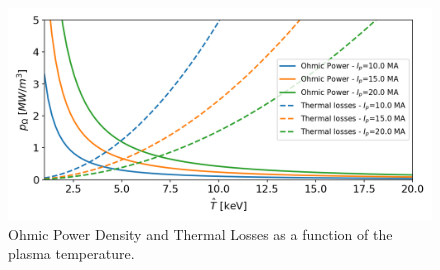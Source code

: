 \begin{figure}[h]
	\centering
	\includegraphics[width=1\linewidth]{figures/chap1/OhmicPower_vs_ThermalLosses}
	\caption{Ohmic Power Density and Thermal Losses as a function of the plasma temperature.}
	\label{fig:ohmicpowervsthermallosses}
\end{figure}



